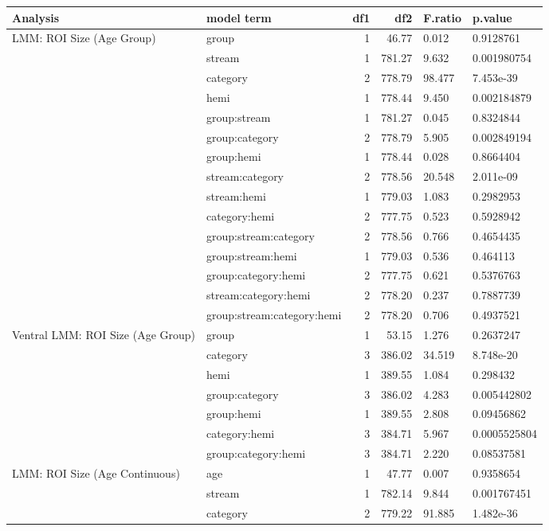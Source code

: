 \begin{table}
\centering
\begin{tabular}{llrrll}
\toprule
Analysis & model term & df1 & df2 & F.ratio & p.value\\
\midrule
LMM: ROI Size (Age Group) & group & 1 & 46.77 & 0.012 & 0.9128761\\
 & stream & 1 & 781.27 & 9.632 & 0.001980754\\
 & category & 2 & 778.79 & 98.477 & 7.453e-39\\
 & hemi & 1 & 778.44 & 9.450 & 0.002184879\\
 & group:stream & 1 & 781.27 & 0.045 & 0.8324844\\
\addlinespace
 & group:category & 2 & 778.79 & 5.905 & 0.002849194\\
 & group:hemi & 1 & 778.44 & 0.028 & 0.8664404\\
 & stream:category & 2 & 778.56 & 20.548 & 2.011e-09\\
 & stream:hemi & 1 & 779.03 & 1.083 & 0.2982953\\
 & category:hemi & 2 & 777.75 & 0.523 & 0.5928942\\
\addlinespace
 & group:stream:category & 2 & 778.56 & 0.766 & 0.4654435\\
 & group:stream:hemi & 1 & 779.03 & 0.536 & 0.464113\\
 & group:category:hemi & 2 & 777.75 & 0.621 & 0.5376763\\
 & stream:category:hemi & 2 & 778.20 & 0.237 & 0.7887739\\
 & group:stream:category:hemi & 2 & 778.20 & 0.706 & 0.4937521\\
\addlinespace
Ventral LMM: ROI Size (Age Group) & group & 1 & 53.15 & 1.276 & 0.2637247\\
 & category & 3 & 386.02 & 34.519 & 8.748e-20\\
 & hemi & 1 & 389.55 & 1.084 & 0.298432\\
 & group:category & 3 & 386.02 & 4.283 & 0.005442802\\
 & group:hemi & 1 & 389.55 & 2.808 & 0.09456862\\
\addlinespace
 & category:hemi & 3 & 384.71 & 5.967 & 0.0005525804\\
 & group:category:hemi & 3 & 384.71 & 2.220 & 0.08537581\\
LMM: ROI Size (Age Continuous) & age & 1 & 47.77 & 0.007 & 0.9358654\\
 & stream & 1 & 782.14 & 9.844 & 0.001767451\\
 & category & 2 & 779.22 & 91.885 & 1.482e-36\\

\end{tabular}
\end{table}
